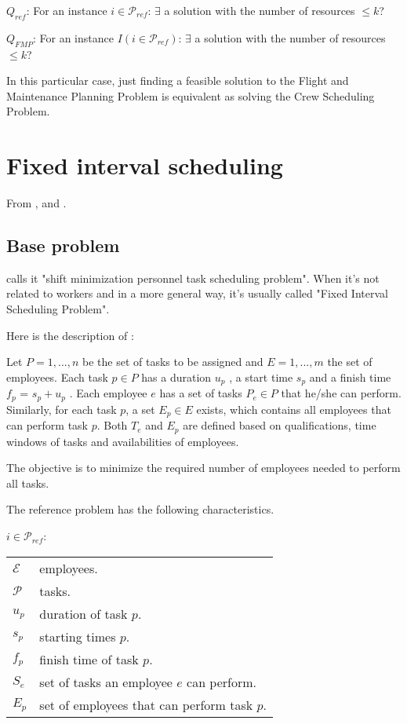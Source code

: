 \documentclass[a4paper,11pt]{article}
\begin{document}
$Q_{ref}$: For an instance $i \in \mathcal{P}_{ref}$: $\exists$ a solution with the number of resources $\leq k$?

$Q_{FMP}$: For an instance $I(i \in \mathcal{P}_{ref})$: $\exists$ a solution with the number of resources $\leq k$?

In this particular case, just finding a feasible solution to the Flight and Maintenance Planning Problem is equivalent as solving the Crew Scheduling Problem.


\clearpage

\section{Fixed interval scheduling}

    From \cite{Smet2015}, \cite{Kolen2007} and \cite{Kovalyov2007}.


    \subsection{Base problem}

    \cite{Smet2015} calls it "shift minimization personnel task scheduling problem". When it's not related to workers and in a more general way, it's usually called "Fixed Interval Scheduling Problem".

    Here is the description of \cite{Smet2015}:

    Let $P = {1, ..., n}$ be the set of tasks to be assigned and $E = {1, ..., m}$ the set of employees. Each task $p \in P$ has a duration $u_p$ , a start time $s_p$ and a finish time $f_p$ = $s_p + u_p$ . Each employee $e$ has a set of tasks $P_e \in P$ that he/she can perform. Similarly, for each task $p$, a set $E_p \in E$ exists, which contains all employees that can perform task $p$. Both $T_e$ and $E_p$ are defined based on qualifications, time windows of tasks and availabilities of employees.

    The objective is to minimize the required number of employees needed to perform all tasks.

    The reference problem has the following characteristics.

    $i \in \mathcal{P}_{ref}$:

    \begin{tabular}{ll}
        $\mathcal{E}$       & employees. \\
        $\mathcal{P}$       & tasks.  \\
        $u_p$     			& duration of task $p$. \\
        $s_p$     			& starting times $p$. \\
        $f_p$     			& finish time of task $p$. \\
        $S_e$               & set of tasks an employee $e$ can perform. \\
        $E_p$               & set of employees that can perform task $p$. \\
    \end{tabular}
\end{document}
